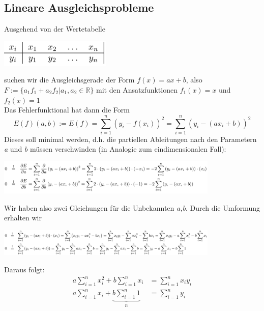 \documentclass{article}
\newenvironment{Figure}
	{\par\medskip\noindent\minipage{\linewidth}}
	{\endminipage\par\medskip}
\theoremstyle{satz}
\theoremstyle{definition}
\begin{document}
\subsection{Lineare Ausgleichsprobleme}
Ausgehend von der Wertetabelle
\begin{Figure}
\centering
\includegraphics[width=200px]{img/LineareAusgleichsproblemeWertetabelle.png}
	\label{fig:Ausgehende Wertetabelle von linearen Ausgleichsprobleme}
\end{Figure}

suchen wir die Ausgleichsgerade der Form $f(x)=ax+b$, also $F:=\{a_1f_1 + a_2f_2 | a_1, a_2 \in \mathbb{R}\}$ mit den Ansatzfunktionen $f_1(x) = x$ und $f_2(x) = 1$\\
Das Fehlerfunktional hat dann die Form
\begin{equation}
	E(f)(a,b) := E(f) = \sum\limits_{i=1}^n (y_i - f(x_i))^2 = \sum\limits_{i=1}^n (y_i - (ax_i + b))^2
\end{equation}
Dieses soll minimal werden, d.h. die partiellen Ableitungen nach den Parametern \textit{a} und \textit{b} müssen verschwinden (in Analogie zum eindimensionalen Fall):
\begin{Figure}
\centering
\includegraphics[width=400px]{img/partielleAbleitungAundB.png}
	\label{fig:partielle Ableitung von a und b}
\end{Figure}
Wir haben also zwei Gleichungen für die Unbekannten \textit{a,b}. Durch die Umformung erhalten wir
\begin{Figure}
\centering
\includegraphics[width=400px]{img/partielleAbleitungAundBUmformung.png}
	\label{fig:Umformung der partiellen Ableitung von a und b}
\end{Figure}
Daraus folgt:
\begin{equation}
\begin{split}
a \sum\limits_{i=1}^n x^2_i + b \sum\limits_{i=1}^n x_i &= \sum\limits_{i=1}^n x_iy_i\\
a \sum\limits_{i=1}^n x_i + \underbrace{b \sum\limits_{i=1}^n 1}_{\substack{n}} &= \sum\limits_{i=1}^n y_i
\end{split}
\end{equation}
\end{document}
